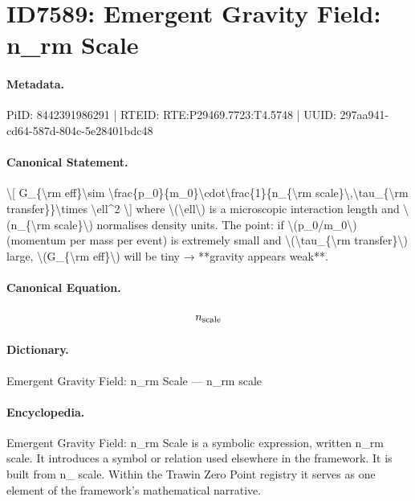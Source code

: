 \section*{ID7589: Emergent Gravity Field: n\_rm Scale}
\paragraph{Metadata.}
PiID: 8442391986291 | RTEID: RTE:P29469.7723:T4.5748 | UUID: 297aa941-cd64-587d-804c-5e28401bdc48

\paragraph{Canonical Statement.}
\textbackslash{}[ G\_\{\textbackslash{}rm eff\}\textbackslash{}sim \textbackslash{}frac\{p\_0\}\{m\_0\}\textbackslash{}cdot\textbackslash{}frac\{1\}\{n\_\{\textbackslash{}rm scale\}\textbackslash{},\textbackslash{}tau\_\{\textbackslash{}rm transfer\}\}\textbackslash{}times \textbackslash{}ell\textasciicircum{}2 \textbackslash{}] where \textbackslash{}(\textbackslash{}ell\textbackslash{}) is a microscopic interaction length and \textbackslash{}(n\_\{\textbackslash{}rm scale\}\textbackslash{}) normalises density units. The point: if \textbackslash{}(p\_0/m\_0\textbackslash{}) (momentum per mass per event) is extremely small and \textbackslash{}(\textbackslash{}tau\_\{\textbackslash{}rm transfer\}\textbackslash{}) large, \textbackslash{}(G\_\{\textbackslash{}rm eff\}\textbackslash{}) will be tiny → **gravity appears weak**.

\paragraph{Canonical Equation.}
\[
n_{\rm scale}
\]

\paragraph{Dictionary.}
Emergent Gravity Field: n\_rm Scale — n\_rm scale

\paragraph{Encyclopedia.}
Emergent Gravity Field: n\_rm Scale is a symbolic expression, written n\_rm scale. It introduces a symbol or relation used elsewhere in the framework. It is built from n\_ scale. Within the Trawin Zero Point registry it serves as one element of the framework's mathematical narrative.
